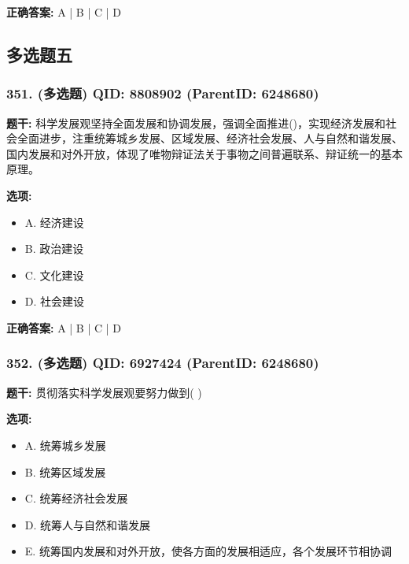 \documentclass[12pt,UTF8]{ctexart}
\begin{document}
\textbf{正确答案:}
A | B | C | D

\vspace{0.3em}\hrulefill\vspace{0.7em}

\subsection*{多选题五}

\subsubsection*{351. (多选题) \small QID: 8808902 (ParentID: 6248680)}

\textbf{题干:}
科学发展观坚持全面发展和协调发展，强调全面推进()，实现经济发展和社会全面进步，注重统筹城乡发展、区域发展、经济社会发展、人与自然和谐发展、国内发展和对外开放，体现了唯物辩证法关于事物之间普遍联系、辩证统一的基本原理。



\textbf{选项:}
\begin{itemize}[leftmargin=*]

  \item A. 经济建设

  \item B. 政治建设

  \item C. 文化建设

  \item D. 社会建设

\end{itemize}

\textbf{正确答案:}
A | B | C | D

\vspace{0.3em}\hrulefill\vspace{0.7em}

\subsubsection*{352. (多选题) \small QID: 6927424 (ParentID: 6248680)}

\textbf{题干:}
贯彻落实科学发展观要努力做到(  )



\textbf{选项:}
\begin{itemize}[leftmargin=*]

  \item A. 统筹城乡发展

  \item B. 统筹区域发展

  \item C. 统筹经济社会发展

  \item D. 统筹人与自然和谐发展

  \item E. 统筹国内发展和对外开放，使各方面的发展相适应，各个发展环节相协调

\end{itemize}
\end{document}
